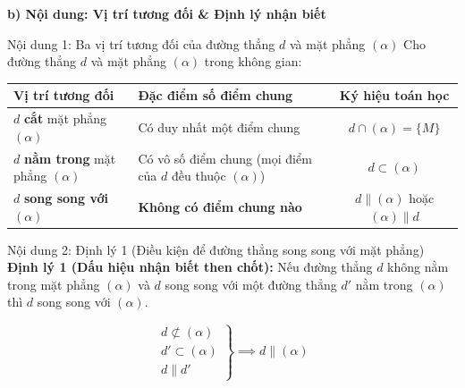 \documentclass[12pt, a4paper]{article}
\begin{document}
\noindent \textbf{b) Nội dung: Vị trí tương đối \& Định lý nhận biết}
\begin{pedabox}{Nội dung 1: Ba vị trí tương đối của đường thẳng $d$ và mặt phẳng $(\alpha)$}
Cho đường thẳng $d$ và mặt phẳng $(\alpha)$ trong không gian:
\begin{center}
\small
\begin{tabularx}{\textwidth}{|p{4.2cm}|X|c|}
\hline
\textbf{Vị trí tương đối} & \textbf{Đặc điểm số điểm chung} & \textbf{Ký hiệu toán học} \\ \hline
$d$ \textbf{cắt} mặt phẳng $(\alpha)$ & Có duy nhất một điểm chung & $d \cap (\alpha) = \{M\}$ \\ \hline
$d$ \textbf{nằm trong} mặt phẳng $(\alpha)$ & Có vô số điểm chung (mọi điểm của $d$ đều thuộc $(\alpha)$) & $d \subset (\alpha)$ \\ \hline
$d$ \textbf{song song với} $(\alpha)$ & \textbf{Không có điểm chung nào} & $d \parallel (\alpha)$ hoặc $(\alpha) \parallel d$ \\ \hline
\end{tabularx}
\end{center}
\end{pedabox}

\begin{pedabox}{Nội dung 2: Định lý 1 (Điều kiện để đường thẳng song song với mặt phẳng)}
\textbf{Định lý 1 (Dấu hiệu nhận biết then chốt):}
Nếu đường thẳng $d$ không nằm trong mặt phẳng $(\alpha)$ và $d$ song song với một đường thẳng $d'$ nằm trong $(\alpha)$ thì $d$ song song với $(\alpha)$.
\begin{center}
\end{center}
$$\left.\begin{array}{l} d \not\subset (\alpha) \\ d' \subset (\alpha) \\ d \parallel d' \end{array}\right\} \implies d \parallel (\alpha)$$
\end{pedabox}
\end{document}
